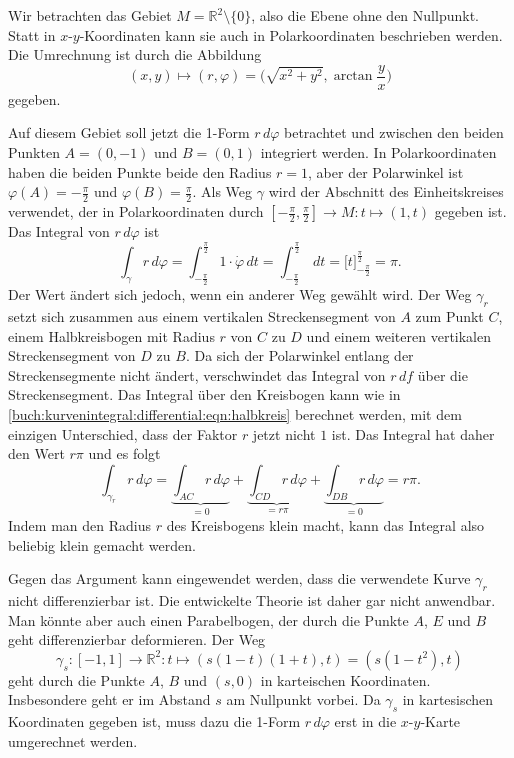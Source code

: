 \begin{beispiel}

Wir betrachten das Gebiet $M=\mathbb{R}^2\setminus\{0\}$, also die
Ebene ohne den Nullpunkt.
Statt in $x$-$y$-Koordinaten kann sie auch in Polarkoordinaten
beschrieben werden.
%
Die Umrechnung ist durch die Abbildung
\[
(x,y) \mapsto (r,\varphi)=\biggl(\sqrt{x^2+y^2},\arctan\frac{y}{x}\biggr)
\]
gegeben.

Auf diesem Gebiet soll jetzt die 1-Form $r\,d\varphi$ betrachtet und
zwischen den beiden Punkten $A=(0,-1)$ und $B=(0,1)$ integriert werden.
In Polarkoordinaten haben die beiden Punkte beide den Radius $r=1$,
aber der Polarwinkel ist $\varphi(A) = -\frac{\pi}2$ und
$\varphi(B)=\frac{\pi}2$.
Als Weg $\gamma$ wird der Abschnitt des Einheitskreises verwendet, der in
Polarkoordinaten durch $[-\frac{\pi}2,\frac{\pi}2]\to M:t\mapsto (1,t)$ 
gegeben ist.
Das Integral von $r\,d\varphi$ ist
\begin{equation}
\int_{\gamma} r\,d\varphi
=
\int_{-\frac{\pi}2}^{\frac{\pi}2}
1\cdot \dot{\varphi}\,dt
=
\int_{-\frac{\pi}2}^{\frac{\pi}2}\,dt
=
\bigl[t\bigr]_{-\frac{\pi}2}^{\frac{\pi}2}
=
\pi.
\label{buch:kurvenintegral:differential:eqn:halbkreis}
\end{equation}
Der Wert ändert sich jedoch, wenn ein anderer Weg gewählt wird.
Der Weg $\gamma_r$ setzt sich zusammen aus einem vertikalen
Streckensegment von $A$ zum Punkt $C$, einem Halbkreisbogen mit
Radius $r$ von $C$ zu $D$ und einem weiteren vertikalen Streckensegment
von $D$ zu $B$.
Da sich der Polarwinkel entlang der Streckensegmente nicht ändert,
verschwindet das Integral von $r\,df$ über die Streckensegment.
Das Integral über den Kreisbogen kann wie in 
\eqref{buch:kurvenintegral:differential:eqn:halbkreis}
berechnet werden, mit dem einzigen Unterschied, dass der Faktor $r$
jetzt nicht $1$ ist.
Das Integral hat daher den Wert $r\pi$ und es folgt
\[
\int_{\gamma_r} r\,d\varphi
=
\underbrace{\int_{AC} r\,d\varphi}_{\displaystyle = 0}
+
\underbrace{\int_{CD} r\,d\varphi}_{\displaystyle = r\pi}
+
\underbrace{\int_{DB} r\,d\varphi}_{\displaystyle = 0}
=
r\pi.
\]
Indem man den Radius $r$ des Kreisbogens klein macht, kann das Integral
also beliebig klein gemacht werden.

Gegen das Argument kann eingewendet werden, dass die verwendete 
Kurve $\gamma_r$ nicht differenzierbar ist.
Die entwickelte Theorie ist daher gar nicht anwendbar.
Man könnte aber auch einen Parabelbogen, der durch die Punkte 
$A$, $E$ und $B$ geht differenzierbar deformieren.
Der Weg 
\[
\gamma_s
\colon
[-1,1]
\to
\mathbb{R}^2
:
t\mapsto (s(1-t)(1+t), t)=(s(1-t^2),t)
\]
geht durch die Punkte $A$, $B$ und $(s,0)$ in karteischen
Koordinaten.
Insbesondere geht er im Abstand $s$ am Nullpunkt vorbei.
Da $\gamma_s$ in kartesischen Koordinaten gegeben ist, muss
dazu die 1-Form $r\,d\varphi$ erst in die $x$-$y$-Karte umgerechnet
werden.


\end{beispiel}
